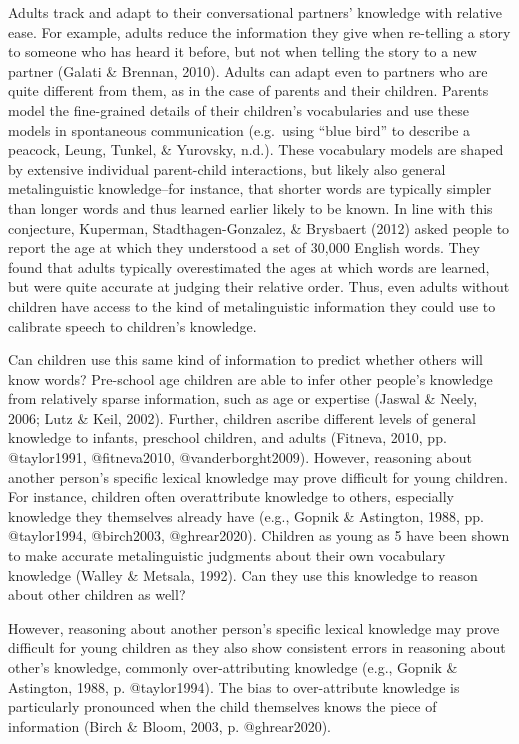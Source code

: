 \documentclass[10pt, letterpaper]{article}
\begin{document}
Adults track and adapt to their conversational partners' knowledge with
relative ease. For example, adults reduce the information they give when
re-telling a story to someone who has heard it before, but not when
telling the story to a new partner (Galati \& Brennan, 2010). Adults can
adapt even to partners who are quite different from them, as in the case
of parents and their children. Parents model the fine-grained details of
their children's vocabularies and use these models in spontaneous
communication (e.g.~using ``blue bird'' to describe a peacock, Leung,
Tunkel, \& Yurovsky, n.d.). These vocabulary models are shaped by
extensive individual parent-child interactions, but likely also general
metalinguistic knowledge--for instance, that shorter words are typically
simpler than longer words and thus learned earlier likely to be known.
In line with this conjecture, Kuperman, Stadthagen-Gonzalez, \&
Brysbaert (2012) asked people to report the age at which they understood
a set of 30,000 English words. They found that adults typically
overestimated the ages at which words are learned, but were quite
accurate at judging their relative order. Thus, even adults without
children have access to the kind of metalinguistic information they
could use to calibrate speech to children's knowledge.

Can children use this same kind of information to predict whether others
will know words? Pre-school age children are able to infer other
people's knowledge from relatively sparse information, such as age or
expertise (Jaswal \& Neely, 2006; Lutz \& Keil, 2002). Further, children
ascribe different levels of general knowledge to infants, preschool
children, and adults (Fitneva, 2010, pp. @taylor1991, @fitneva2010,
@vanderborght2009). However, reasoning about another person's specific
lexical knowledge may prove difficult for young children. For instance,
children often overattribute knowledge to others, especially knowledge
they themselves already have (e.g., Gopnik \& Astington, 1988, pp.
@taylor1994, @birch2003, @ghrear2020). Children as young as 5 have been
shown to make accurate metalinguistic judgments about their own
vocabulary knowledge (Walley \& Metsala, 1992). Can they use this
knowledge to reason about other children as well?

However, reasoning about another person's specific lexical knowledge may
prove difficult for young children as they also show consistent errors
in reasoning about other's knowledge, commonly over-attributing
knowledge (e.g., Gopnik \& Astington, 1988, p. @taylor1994). The bias to
over-attribute knowledge is particularly pronounced when the child
themselves knows the piece of information (Birch \& Bloom, 2003, p.
@ghrear2020).
\end{document}

